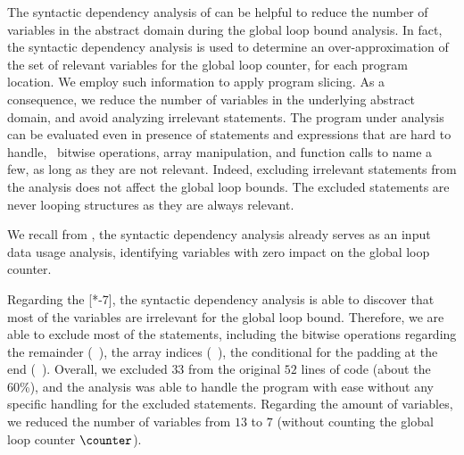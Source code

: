 The syntactic dependency analysis of  can be helpful to reduce the number of variables in the abstract domain during the global loop bound analysis.
In fact, the syntactic dependency analysis is used to determine an over-approximation of the set of relevant variables for the global loop counter, for each program location.
We employ such information to apply program slicing.
As a consequence, we reduce the number of variables in the underlying abstract domain, and avoid analyzing irrelevant statements.
The program under analysis can be evaluated even in presence of statements and expressions that are hard to handle, \eg~bitwise operations, array manipulation, and function calls to name a few, as long as they are not relevant.
Indeed, excluding irrelevant statements from the analysis does not affect the global loop bounds.
The excluded statements are never looping structures as they are always relevant.

We recall from , the syntactic dependency analysis already serves as an input data usage analysis, identifying variables with zero impact on the global loop counter.

\begin{example}
%   

Regarding the [*-7], the syntactic dependency analysis is able to discover that most of the variables are irrelevant for the global loop bound.
Therefore, we are able to exclude most of the statements, including the bitwise operations regarding the remainder (\eg~), the array indices (\eg~), the conditional for the padding at the end (\cf~).
%
Overall, we excluded $33$ from the original $52$ lines of code (about the 60\%), and the analysis was able to handle the program with ease without any specific handling for the excluded statements.
Regarding the amount of variables, we reduced the number of variables from $13$ to $7$ (without counting the global loop counter $\counter$).
\end{example}



